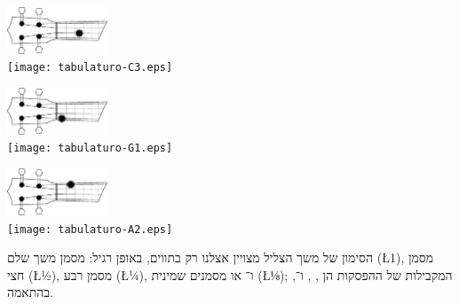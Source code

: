 \vspace{\baselineskip}
\begin{minipage}{4cm}
	\centering
	\includegraphics[width=3cm]{plano-C3.eps}\\
	\texttt{[image: tabulaturo-C3.eps]}
\end{minipage}\hfill
\begin{minipage}{4cm}
	\centering
	\includegraphics[width=3cm]{plano-G1.eps}\\
	\texttt{[image: tabulaturo-G1.eps]}
\end{minipage}\hfill
\begin{minipage}{4cm}
	\centering
	\includegraphics[width=3cm]{plano-A2.eps}\\
	\texttt{[image: tabulaturo-A2.eps]}
\end{minipage}
\vspace{\baselineskip}

הסימון של משך הצליל מצויין אצלנו רק בתווים, באופן רגיל:  מסמן משך שלם (\L{1}),  מסמן חצי (\L{½}),  מסמן רבע (\L{¼}), ו־ או  מסמנים שמינית (\L{⅛}); המקבילות של ההפסקות הן , ,  ו־, בהתאמה.

